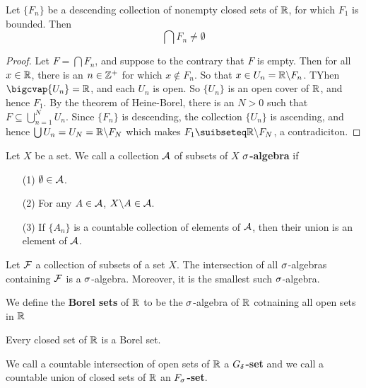 \begin{theorem}\label{1.1.6}
    Let $\{F_n\}$ be a descending collection of nonempty closed sets of $\mathbb{R}$,
    for which  $F_1$ is bounded. Then
    \begin{equation*}
        \bigcap{F_n} \neq \emptyset
    \end{equation*}
\end{theorem}
\begin{proof}
    Let $F=\bigcap{F_n}$, and suppose to the contrary that $F$ is empty. Then
    for all  $x \in \mathbb{R}$, there is an  $n \in \mathbb{Z}^+$ for which  $x \notin F_n$. So
    that  $x \in U_n=\mathbb{R}\backslash F_n$. TYhen $\bigcvap{U_n}=\R$, and each $U_n$ is
    open. So  $\{U_n\}$ is an open cover of $\mathbb{R}$, and hence $F_1$. By the
    theorem of Heine-Borel, there is an $N>0$ such that  $F \subseteq
    \bigcup_{n=1}^N{U_n}$. Since $\{F_n\}$ is descending, the collection
    $\{U_n\}$ is ascending, and hence $\bigcup{U_n}=U_N=\mathbb{R}\backslash F_N$ which
    makes $F_1 \suibseteq \com{\R}{F_N}$, a contradiciton.
\end{proof}

\begin{definition}
    Let $X$ be a set. We call a collection  $\mathcal{A}$ of subsets of  $X$
    \textbf{$\sigma$-algebra} if
    \begin{enumerate}
        \item[(1)] $\emptyset \in \mathcal{A}$.

        \item[(2)] For any $A \in \mathcal{A}$,  $X\backslash A \in \mathcal{A}$.

        \item[(3)] If $\{A_n\}$ is a countable collection of elements of $\mathcal{A}$,
            then their union is an element of  $\mathcal{A}$.
    \end{enumerate}
\end{definition}

\begin{lemma}\label{1.1.7}
    Let $\mathcal{F}$ a collection of subsets of a set $X$. The intersection of all
    $\sigma$-algebras containing  $\mathcal{F}$ is a  $\sigma$-algebra. Moreover, it is the
    smallest such  $\sigma$-algebra.
\end{lemma}

\begin{definition}
    We define the \textbf{Borel sets} of $\mathbb{R}$ to be the  $\sigma$-algebra of  $\mathbb{R}$
    cotnaining all open sets in  $\mathbb{R}$
\end{definition}

\begin{lemma}\label{1.1.8}
    Every closed set of $\mathbb{R}$ is a Borel set.
\end{lemma}

\begin{definition}
    We call a countable intersection of open sets of $\mathbb{R}$ a
    \textbf{$G_\delta$-set} and we call a countable union of closed sets of $\mathbb{R}$ an
     \textbf{$F_\sigma$-set}.
\end{definition}
